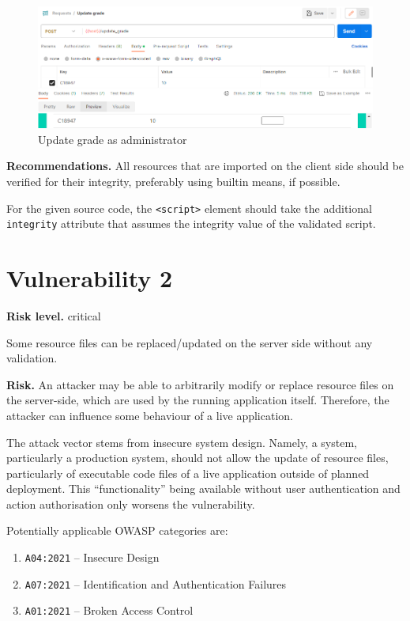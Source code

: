 \documentclass[parskip=half]{scrartcl}
\begin{document}
\begin{figure}[h]
    \centering
    \includegraphics[width=\textwidth]{update_grade}
    \caption{Update grade as administrator}
    \label{fig:updategradeadmin}
\end{figure}

\textbf{Recommendations.} All resources that are imported on the client side
should be verified for their integrity, preferably using builtin means, if
possible.

For the given source code, the \texttt{<script>} element should take the
additional \texttt{integrity} attribute that assumes the integrity value of the
validated script.

\clearpage
\newpage

\section*{Vulnerability 2}\label{vuln2}

\textbf{Risk level.} critical

Some resource files can be replaced/updated on the server side without any
validation.

\textbf{Risk.} An attacker may be able to arbitrarily modify or replace
resource files on the server-side, which are used by the running application
itself. Therefore, the attacker can influence some behaviour of a live
application.

The attack vector stems from insecure system design. Namely, a system,
particularly a production system, should not allow the update of resource
files, particularly of executable code files of a live application outside of
planned deployment. This ``functionality'' being available without user
authentication and action authorisation only worsens the vulnerability.

Potentially applicable OWASP categories are:
\begin{enumerate}
    \item \texttt{A04:2021} -- Insecure Design
    \item \texttt{A07:2021} -- Identification and Authentication Failures%
    \item \texttt{A01:2021} -- Broken Access Control%
\end{enumerate}
\end{document}
